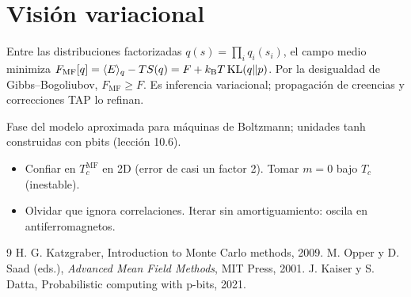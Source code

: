 \documentclass[11pt,a4paper]{article}
\begin{document}
\section{Visión variacional}
Entre las distribuciones factorizadas $q(s)=\prod_iq_i(s_i)$, el campo medio minimiza $F_{\text{MF}}[q]=\langle E\rangle_q-TS(q)=F+k_{\mathrm B} T\,\mathrm{KL}(q\|p)$.
Por la desigualdad de Gibbs--Bogoliubov, $F_{\text{MF}}\ge F$. Es inferencia variacional; propagación de creencias y correcciones TAP lo refinan.

\begin{aplicacion}
Fase del modelo aproximada para máquinas de Boltzmann; unidades tanh construidas con pbits (lección 10.6).
\end{aplicacion}

\begin{error}
\begin{itemize}[nosep]
\item Confiar en $T_c^{\text{MF}}$ en 2D (error de casi un factor 2). \quad Tomar $m=0$ bajo $T_c$ (inestable).
\item Olvidar que ignora correlaciones. \quad Iterar sin amortiguamiento: oscila en antiferromagnetos.
\end{itemize}
\end{error}

\begin{thebibliography}{9}\small
{} H. G. Katzgraber, Introduction to Monte Carlo methods, 2009.
 M. Opper y D. Saad (eds.), \emph{Advanced Mean Field Methods}, MIT Press, 2001.
 J. Kaiser y S. Datta, Probabilistic computing with p-bits, 2021.
\end{thebibliography}
\end{document}
